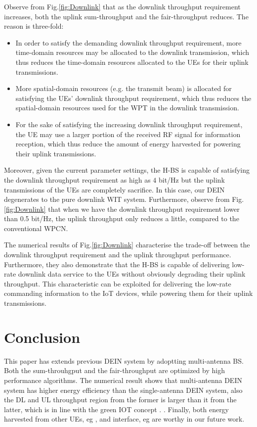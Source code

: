 \documentclass[12pt,draftcls,onecolumn,journal]{IEEEtran}
\begin{document}
Observe from Fig.\ref{fig:Downlink} that as the downlink throughput requirement increases, both the uplink sum-throughput and the fair-throughput reduces. The reason is three-fold:
\begin{itemize}
	\item In order to satisfy the demanding downlink throughput requirement, more time-domain resources may be allocated to the downlink transmission, which thus reduces the time-domain resources allocated to the UEs for their uplink transmissions. 
	\item More spatial-domain resources (e.g. the transmit beam) is allocated for satisfying the UEs' downlink throughput requirement, which thus reduces the spatial-domain resources used for the WPT in the downlink transmission. 
	\item For the sake of satisfying the increasing downlink throughput requirement, the UE may use a larger portion of the received RF signal for information reception, which thus reduce the amount of energy harvested for powering their uplink transmissions.
\end{itemize}
Moreover, given the current parameter settings, the H-BS is capable of satisfying the downlink throughput requirement as high as $4$ bit/Hz but the uplink transmissions of the UEs are completely sacrifice. In this case, our DEIN degenerates to the pure downlink WIT system. Furthermore, observe from Fig.\ref{fig:Downlink} that when we have the downlink throughput requirement lower than 0.5 bit/Hz, the uplink throughput only reduces a little, compared to the conventional WPCN. 

The numerical results of Fig.\ref{fig:Downlink} characterise the trade-off between the downlink throughput requirement and the uplink throughput performance. Furthermore, they also demonstrate that the H-BS is capable of delivering low-rate downlink data service to the UEs without obviously degrading their uplink throughput. This characteristic can be exploited for delivering the low-rate commanding information to the IoT devices, while powering them for their uplink transmissions.

\section{Conclusion}
This paper has extends previous DEIN system by adoptting multi-antenna BS. Both the sum-throuhgput and the fair-throughput are optimized by high performance algorithms. The numerical result shows that multi-antenna DEIN system has higher energy efficiency than the single-antenna DEIN system, also the DL and UL throughput region from the former is larger than it from the latter, \cbstart which is in line with the green IOT concept \cite{access_5}. \cbend. \cbstart Finally, both energy harvested from other UEs, eg \cite{access_1}, and interface, eg \cite{access_2} are worthy in our future work. \cbend


 






\end{document}

